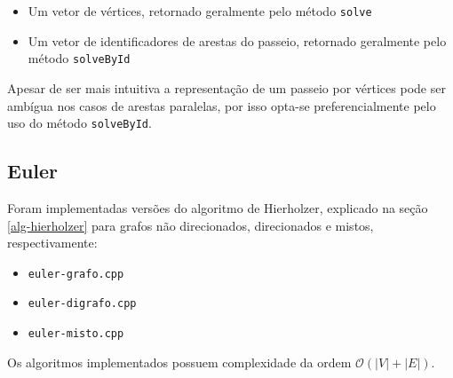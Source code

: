 \begin{itemize}
    \item Um vetor de vértices, retornado geralmente pelo método \texttt{solve}
    \item Um vetor de identificadores de arestas do passeio, retornado geralmente pelo método \texttt{solveById}
\end{itemize}

Apesar de ser mais intuitiva a representação de um passeio por vértices pode ser ambígua nos casos de arestas paralelas, por isso opta-se preferencialmente pelo uso do método \texttt{solveById}.

\subsection{Euler}

Foram implementadas versões do algoritmo de Hierholzer, explicado na seção \ref{alg-hierholzer} para grafos não direcionados, direcionados e mistos, respectivamente:


\begin{itemize}
    \item \texttt{euler-grafo.cpp}
    \item \texttt{euler-digrafo.cpp}
    \item \texttt{euler-misto.cpp}
\end{itemize}

Os algoritmos implementados possuem complexidade da ordem $\mathcal{O}(|V| + |E|)$.

